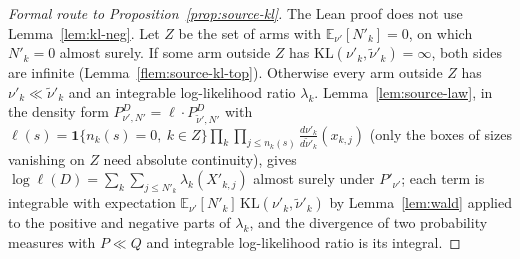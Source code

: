 \documentclass[11pt]{article}
\newcommand{\E}{\mathbb{E}}
\begin{document}
\begin{proof}[Formal route to Proposition~\ref{prop:source-kl}]
The Lean proof does not use Lemma~\ref{lem:kl-neg}. Let $Z$ be the set of arms with
$\E_{\nu'}[N'_k]=0$, on which $N'_k=0$ almost surely. If some arm outside $Z$ has
$\mathrm{KL}(\nu'_k,\tilde\nu'_k)=\infty$, both sides are infinite (Lemma~\ref{flem:source-kl-top}).
Otherwise every arm outside $Z$ has $\nu'_k\ll\tilde\nu'_k$ and an integrable log-likelihood ratio
$\lambda_k$. Lemma~\ref{lem:source-law}, in the density form
$P^D_{\nu',N'}=\ell\cdot P^D_{\tilde\nu',N'}$ with
$\ell(s)=\mathbf 1\{n_k(s)=0,\ k\in Z\}\prod_k\prod_{j\le n_k(s)}\frac{d\nu'_k}{d\tilde\nu'_k}(x_{k,j})$
(only the boxes of sizes vanishing on $Z$ need absolute continuity), gives
$\log\ell(D)=\sum_k\sum_{j\le N'_k}\lambda_k(X'_{k,j})$ almost surely under $P'_{\nu'}$; each term is
integrable with expectation $\E_{\nu'}[N'_k]\,\mathrm{KL}(\nu'_k,\tilde\nu'_k)$ by
Lemma~\ref{lem:wald} applied to the positive and negative parts of $\lambda_k$, and the divergence of
two probability measures with $P\ll Q$ and integrable log-likelihood ratio is its integral.
\end{proof}
\end{document}
